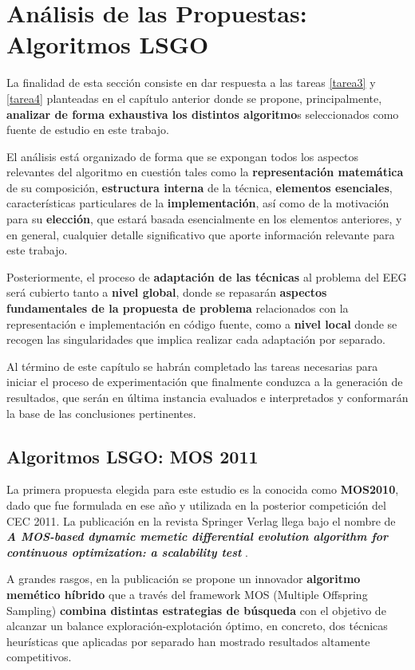 \chapter{Análisis de las Propuestas: Algoritmos LSGO}\label{Analisis}

La finalidad de esta sección consiste en dar respuesta a las tareas \ref{tarea3} y \ref{tarea4} planteadas en el capítulo anterior donde se propone, principalmente, \textbf{analizar de forma exhaustiva los distintos algoritmo}s seleccionados como fuente de estudio en este trabajo. 

El análisis está organizado de forma que se expongan todos los aspectos relevantes del algoritmo en cuestión tales como la \textbf{representación matemática} de su composición, \textbf{estructura interna} de la técnica, \textbf{elementos esenciales}, características particulares de la \textbf{implementación}, así como de la motivación para su \textbf{elección}, que estará basada esencialmente en los elementos anteriores, y en general, cualquier detalle significativo que aporte información relevante para este trabajo.

Posteriormente, el proceso de \textbf{adaptación de las técnicas} al problema del EEG será cubierto tanto a \textbf{nivel global}, donde se repasarán \textbf{aspectos fundamentales de la propuesta de problema} relacionados con la representación e implementación en código fuente, como a \textbf{nivel local} donde se recogen las singularidades que implica realizar cada adaptación por separado.

Al término de este capítulo se habrán completado las tareas necesarias para iniciar el proceso de experimentación que finalmente conduzca a la generación de resultados, que serán en última instancia evaluados e interpretados y conformarán la base de las conclusiones pertinentes.

\section{Algoritmos LSGO: MOS 2011}
La primera propuesta elegida para este estudio es la conocida como \textbf{MOS2010}, dado que fue formulada en ese año y utilizada en la posterior competición del CEC 2011\cite{ComprehensiveComparison}. La publicación en la revista Springer Verlag llega bajo el nombre de \textbf{\textit{A MOS-based dynamic memetic differential evolution algorithm for continuous optimization: a scalability test}} \cite{MOS2010}.

A grandes rasgos, en la publicación se propone un innovador \textbf{algoritmo memético híbrido} que a través del framework MOS (Multiple Offspring Sampling) \textbf{combina distintas estrategias de búsqueda} con el objetivo de alcanzar un balance exploración-explotación óptimo, en concreto, dos técnicas heurísticas que aplicadas por separado han mostrado resultados altamente competitivos.

